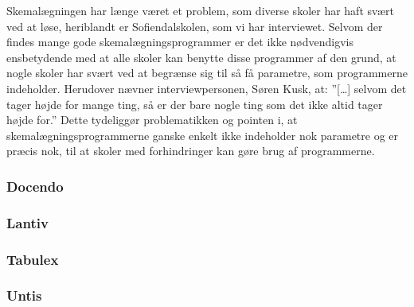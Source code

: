 Skemalægningen har længe været et problem, som diverse skoler har haft svært ved at løse, heriblandt er Sofiendalskolen, som vi har interviewet.
Selvom der findes mange gode skemalægningsprogrammer er det ikke nødvendigvis ensbetydende med at alle skoler kan benytte disse programmer af den grund, at nogle skoler har svært ved at begrænse sig til så få parametre, som programmerne indeholder. Herudover nævner interviewpersonen, Søren Kusk, at: ”[…] selvom det tager højde for mange ting, så er der bare nogle ting som det ikke altid tager højde for\cite{interview}.” Dette tydeliggør problematikken og pointen i, at skemalægningsprogrammerne ganske enkelt ikke indeholder nok parametre og er præcis nok, til at skoler med forhindringer kan gøre brug af programmerne. 

  \subsubsection{Docendo}
    

  \subsubsection{Lantiv}
    

  \subsubsection{Tabulex}
    

  \subsubsection{Untis}
    